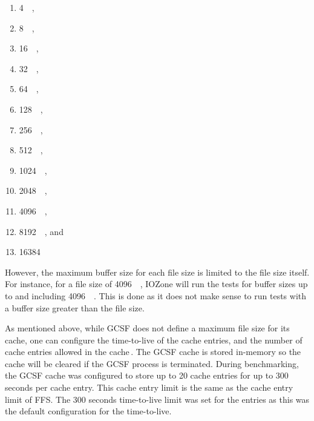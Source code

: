 \begin{enumerate}
	\item \SI{4}{\kilo\byte},
	\item \SI{8}{\kilo\byte},
	\item \SI{16}{\kilo\byte},
	\item \SI{32}{\kilo\byte},
	\item \SI{64}{\kilo\byte},
	\item \SI{128}{\kilo\byte},
	\item \SI{256}{\kilo\byte},
	\item \SI{512}{\kilo\byte},
	\item \SI{1024}{\kilo\byte},
	\item \SI{2048}{\kilo\byte},
	\item \SI{4096}{\kilo\byte},
	\item \SI{8192}{\kilo\byte}, and
	\item \SI{16384}{\kilo\byte}
\end{enumerate}

However, the maximum buffer size for each file size is limited to the file size itself. For instance, for a file size of \SI{4096}{\kilo\byte}, IOZone will run the tests for buffer sizes up to and including \SI{4096}{\kilo\byte}. This is done as it does not make sense to run tests with a buffer size greater than the file size.

As mentioned above, while \gls{GCSF} does not define a maximum file size for its cache, one can configure the \mbox{time-to-live} of the cache entries, and the number of cache entries allowed in the cache\,\cite{sergiudanGcsfConfigRust}. The \gls{GCSF} cache is stored \mbox{in-memory} so the cache will be cleared if the \gls{GCSF} process is terminated. During benchmarking, the \gls{GCSF} cache was configured to store up to 20 cache entries for up to 300 seconds per cache entry. This cache entry limit is the same as the cache entry limit of \gls{FFS}. The 300 seconds \mbox{time-to-live} limit was set for the entries as this was the default configuration for the \mbox{time-to-live}.

